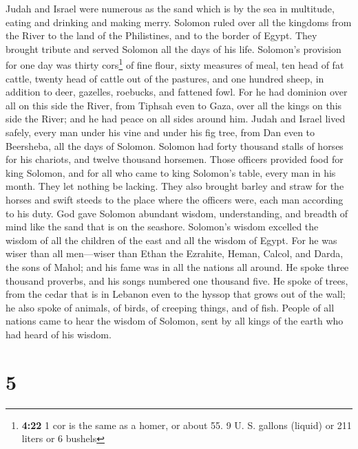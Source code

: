  Judah and Israel were numerous as the sand which is by
the sea in multitude, eating and drinking and making merry.
 Solomon ruled over all the kingdoms from the River to
the land of the Philistines, and to the border of Egypt. They brought
tribute and served Solomon all the days of his life. 
Solomon's provision for one day was thirty cors\footnote{\textbf{4:22} 1
  cor is the same as a homer, or about 55. 9 U. S. gallons (liquid) or
  211 liters or 6 bushels} of fine flour, sixty measures of meal,
 ten head of fat cattle, twenty head of cattle out of the
pastures, and one hundred sheep, in addition to deer, gazelles,
roebucks, and fattened fowl.  For he had dominion over
all on this side the River, from Tiphsah even to Gaza, over all the
kings on this side the River; and he had peace on all sides around him.
 Judah and Israel lived safely, every man under his vine
and under his fig tree, from Dan even to Beersheba, all the days of
Solomon.  Solomon had forty thousand stalls of horses for
his chariots, and twelve thousand horsemen.  Those
officers provided food for king Solomon, and for all who came to king
Solomon's table, every man in his month. They let nothing be lacking.
 They also brought barley and straw for the horses and
swift steeds to the place where the officers were, each man according to
his duty.  God gave Solomon abundant wisdom,
understanding, and breadth of mind like the sand that is on the
seashore.  Solomon's wisdom excelled the wisdom of all
the children of the east and all the wisdom of Egypt. 
For he was wiser than all men---wiser than Ethan the Ezrahite, Heman,
Calcol, and Darda, the sons of Mahol; and his fame was in all the
nations all around.  He spoke three thousand proverbs,
and his songs numbered one thousand five.  He spoke of
trees, from the cedar that is in Lebanon even to the hyssop that grows
out of the wall; he also spoke of animals, of birds, of creeping things,
and of fish.  People of all nations came to hear the
wisdom of Solomon, sent by all kings of the earth who had heard of his
wisdom.

\hypertarget{section-4}{%
\section{5}\label{section-4}}


